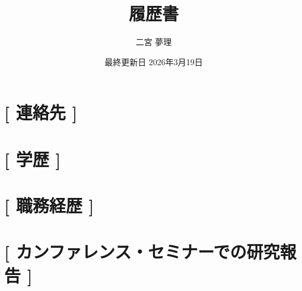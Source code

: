 \documentclass[dvipdfmx,a4paper]{jsarticle}
\title{履歴書}
\author{二宮 夢理}
\date{最終更新日 2026年3月19日}
\begin{document}
\maketitle

\section*{\textbf{[ }連絡先\textbf{ ]}}



\section*{\textbf{[ }学歴\textbf{ ]}}

\section*{\textbf{[ }職務経歴\textbf{ ]}}


\section*{\textbf{[ }カンファレンス・セミナーでの研究報告\textbf{ ]}}


\end{document}
